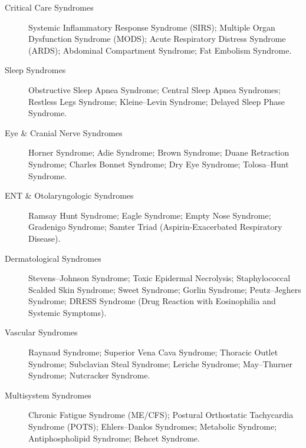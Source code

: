 \begin{description}
\item[Critical Care Syndromes] Systemic Inflammatory Response Syndrome (SIRS); Multiple Organ Dysfunction Syndrome (MODS); Acute Respiratory Distress Syndrome (ARDS); Abdominal Compartment Syndrome; Fat Embolism Syndrome.

\item[Sleep Syndromes] Obstructive Sleep Apnea Syndrome; Central Sleep Apnea Syndromes; Restless Legs Syndrome; Kleine–Levin Syndrome; Delayed Sleep Phase Syndrome.

\item[Eye \& Cranial Nerve Syndromes] Horner Syndrome; Adie Syndrome; Brown Syndrome; Duane Retraction Syndrome; Charles Bonnet Syndrome; Dry Eye Syndrome; Tolosa–Hunt Syndrome.

\item[ENT \& Otolaryngologic Syndromes] Ramsay Hunt Syndrome; Eagle Syndrome; Empty Nose Syndrome; Gradenigo Syndrome; Samter Triad (Aspirin-Exacerbated Respiratory Disease).

\item[Dermatological Syndromes] Stevens–Johnson Syndrome; Toxic Epidermal Necrolysis; Staphylococcal Scalded Skin Syndrome; Sweet Syndrome; Gorlin Syndrome; Peutz–Jeghers Syndrome; DRESS Syndrome (Drug Reaction with Eosinophilia and Systemic Symptoms).

\item[Vascular Syndromes] Raynaud Syndrome; Superior Vena Cava Syndrome; Thoracic Outlet Syndrome; Subclavian Steal Syndrome; Leriche Syndrome; May–Thurner Syndrome; Nutcracker Syndrome.

\item[Multisystem Syndromes] Chronic Fatigue Syndrome (ME/CFS); Postural Orthostatic Tachycardia Syndrome (POTS); Ehlers–Danlos Syndromes; Metabolic Syndrome; Antiphospholipid Syndrome; Behcet Syndrome.
\end{description}
